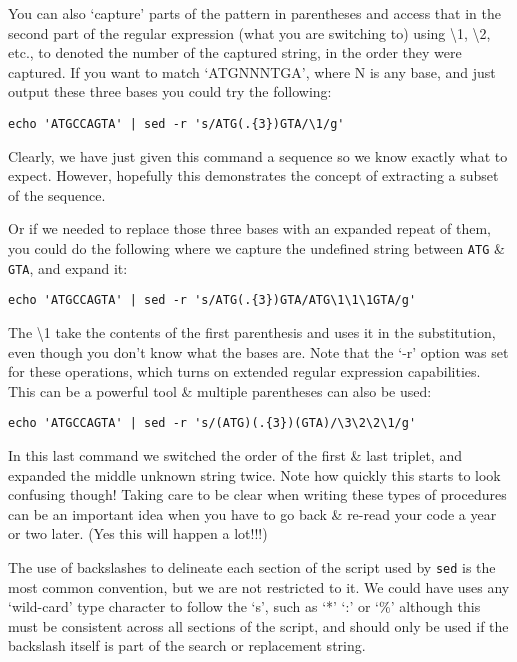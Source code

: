You can also `capture' parts of the pattern in parentheses and access that in the second part of the regular expression (what you are switching to) using \textbackslash 1, \textbackslash 2, etc., to denoted the number of the captured string, in the order they were captured.
If you want to match `ATGNNNTGA', where N is any base, and just output these three bases you could try the following:\\
\begin{lstlisting}
echo 'ATGCCAGTA' | sed -r 's/ATG(.{3})GTA/\1/g'
\end{lstlisting}

Clearly, we have just given this command a sequence so we know exactly what to expect.
However, hopefully this demonstrates the concept of extracting a subset of the sequence.

Or if we needed to replace those three bases with an expanded repeat of them, you could do the following where we capture the undefined string between \texttt{ATG} \& \texttt{GTA}, and expand it: \\
\begin{lstlisting}
echo 'ATGCCAGTA' | sed -r 's/ATG(.{3})GTA/ATG\1\1\1GTA/g'
\end{lstlisting}

The \textbackslash 1 take the contents of the first parenthesis and uses it in the substitution, even though you don't know what the bases are.
Note that the `-r' option was set for these operations, which turns on extended regular expression capabilities.
This can be a powerful tool \& multiple parentheses can also be used: \\
\begin{lstlisting}
echo 'ATGCCAGTA' | sed -r 's/(ATG)(.{3})(GTA)/\3\2\2\1/g'
\end{lstlisting}

In this last command we switched the order of the first \& last triplet, and expanded the middle unknown string twice.
Note how quickly this starts to look confusing though!
Taking care to be clear when writing these types of procedures can be an important idea when you have to go back \& re-read your code a year or two later.
(Yes this will happen a lot!!!)

\begin{information}
The use of backslashes to delineate each section of the script used by \texttt{sed} is the most common convention, but we are not restricted to it.
We could have uses any `wild-card' type character to follow the `s', such as `*' `:' or `\%' although this must be consistent across all sections of the script, and should only be used if the backslash itself is part of the search or replacement string.
\end{information}

